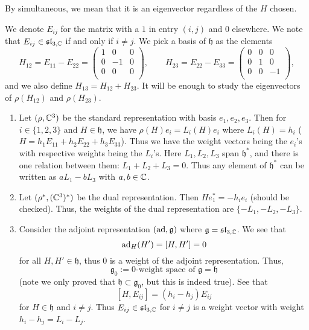 By simultaneous, we mean that it is an eigenvector regardless of the $H$ chosen.

We denote $E_{ij}$ for the matrix with a $1$ in entry $(i,j)$ and 0 elsewhere. We note that $E_{ij} \in \mathfrak{sl}_{3, \mathbb C}$ if and only if $i \neq j$. We pick a basis of $\mathfrak h$ as the elements
\[
    H_{12} = E_{11} - E_{22} =
    \begin{pmatrix}
        1 & 0  & 0 \\
        0 & -1 & 0 \\
        0 & 0  & 0 \\
    \end{pmatrix}, \qquad
    H_{23} = E_{22} - E_{33} =
    \begin{pmatrix}
        0 & 0 & 0  \\
        0 & 1 & 0  \\
        0 & 0 & -1 \\
    \end{pmatrix},
\]
and we also define $H_{13} = H_{12} + H_{23}$. It will be enough to study the eigenvectors of $\rho(H_{12})$ and $\rho(H_{23})$.

\begin{example}
    \begin{enumerate}
        \item Let $(\rho, \mathbb C^3)$ be the standard representation with basis $e_1, e_2, e_3$. Then for $i \in \{1,2,3\}$ and $H \in \mathfrak h$, we have $\rho(H) e_i = L_i(H)e_i$ where $L_i(H) = h_i$ ($H = h_1E_{11} + h_2E_{22} + h_3E_{33}$). Thus we have the weight vectors being the $e_i$'s with respective weights being the $L_i$'s. Here $L_1, L_2, L_3$ span $\mathfrak h^*$, and there is one relation between them: $L_1 + L_2 + L_3 = 0$. Thus any element of $\mathfrak h^*$ can be written as $aL_1 - bL_3$ with $a, b \in \mathbb C$.
        \item Let $(\rho^*, (\mathbb C^3)^*)$ be the dual representation. Then $He_1^* = -h_ie_i$ (should be checked). Thus, the weights of the dual representation are $\{-L_1, -L_2, -L_3\}$.
        \item Consider the adjoint representation $(\operatorname{ad}, \mathfrak g)$ where $\mathfrak g = \mathfrak{sl}_{3, \mathbb C}$. We see that
              \[ \operatorname{ad}_H(H') = [H, H'] = 0 \]
              for all $H, H' \in \mathfrak h$, thus $0$ is a weight of the adjoint representation. Thus,
              \[ \mathfrak g_0 := \text{$0$-weight space of $\mathfrak g$} = \mathfrak h \]
              (note we only proved that $\mathfrak h \subset \mathfrak g_0$, but this is indeed true). See that
              \[ [H, E_{ij}] = (h_i - h_j)E_{ij} \]
              for $H \in \mathfrak h$ and $i \neq j$. Thus $E_{ij} \in \mathfrak{sl}_{3, \mathbb C}$ for $i \neq j$ is a weight vector with weight $h_i - h_j = L_i - L_j$.
    \end{enumerate}
\end{example}

